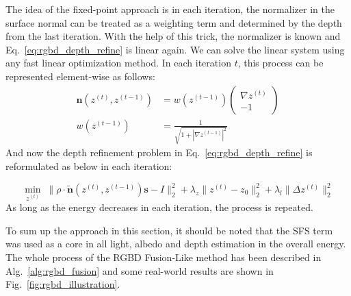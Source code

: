 The idea of the fixed-point approach is in each iteration, the normalizer in the surface normal can be treated as a weighting term and determined by the depth from the last iteration.
With the help of this trick, the normalizer is known and Eq.~\ref{eq:rgbd_depth_refine} is linear again.
We can solve the linear system using any fast linear optimization method.
In each iteration $t$, this process can be represented element-wise as follows:
\begin{equation}
    \begin{split}
        \mathbf{n}(z^{(t)}, z^{(t-1)}) &= w(z^{(t-1)})
        \begin{pmatrix} 
             \nabla z^{(t)}\\ 
             -1
             \end{pmatrix}\\
             w(z^{(t-1)}) &=  \frac{1}{\sqrt{1 + |\nabla z^{(t-1)}|^2}}
    \end{split}
\end{equation}
And now the depth refinement problem in Eq.~\ref{eq:rgbd_depth_refine} is reformulated as below in each iteration:

\begin{equation}\label{eq:rgbd_depth_refine2}
    \min_{z^{(t)}} \; \lVert \rho \cdot \tilde{\mathbf{n}}(z^{(t)}, z^{(t-1)}) \mathbf{s} -I\rVert^2_2 + \lambda_z \lVert z^{(t)} - z_0\rVert^2_2 + \lambda_l \lVert \Delta z^{(t)} \rVert^2_2
\end{equation}
As long as the energy decreases in each iteration, the process is repeated.

To sum up the approach in this section, it should be noted that the SFS term was used as a core in all light, albedo and depth estimation in the overall energy.
The whole process of the RGBD Fusion-Like method has been described in Alg.~\ref{alg:rgbd_fusion} and some real-world results are shown in Fig.~\ref{fig:rgbd_illustration}.



